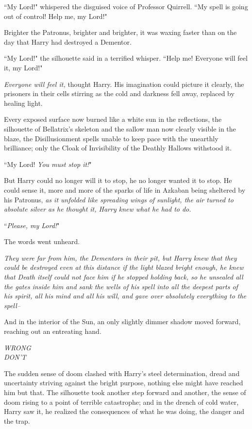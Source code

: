 ``My Lord!" whispered the disguised voice of Professor Quirrell. ``My spell is going out of control! Help me, my Lord!"

Brighter the Patronus, brighter and brighter, it was waxing faster than on the day that Harry had destroyed a Dementor.

``My Lord!" the silhouette said in a terrified whisper. ``Help me! Everyone will feel it, my Lord!"

\emph{Everyone will feel it,} thought Harry. His imagination could picture it clearly, the prisoners in their cells stirring as the cold and darkness fell away, replaced by healing light.

Every exposed surface now burned like a white sun in the reflections, the silhouette of Bellatrix's skeleton and the sallow man now clearly visible in the blaze, the Disillusionment spells unable to keep pace with the unearthly brilliance; only the Cloak of Invisibility of the Deathly Hallows withstood it.

``My Lord! \emph{You must stop it!}"

But Harry could no longer will it to stop, he no longer wanted it to stop. He could sense it, more and more of the sparks of life in Azkaban being sheltered by his Patronus, \emph{as it unfolded like spreading wings of sunlight, the air turned to absolute silver as he thought it, Harry knew what he had to do.}

``\emph{Please, my Lord!}"

The words went unheard.

\emph{They were far from him, the Dementors in their pit, but Harry knew that they could be destroyed even at this distance if the light blazed bright enough, he knew that Death itself could not face him if he stopped holding back, so he unsealed all the gates inside him and sank the wells of his spell into all the deepest parts of his spirit, all his mind and all his will, and gave over absolutely everything to the spell\---}

And in the interior of the Sun, an only slightly dimmer shadow moved forward, reaching out an entreating hand.

\emph{WRONG\\
DON'T}

The sudden sense of doom clashed with Harry's steel determination, dread and uncertainty striving against the bright purpose, nothing else might have reached him but that. The silhouette took another step forward and another, the sense of doom rising to a point of terrible catastrophe; and in the drench of cold water, Harry saw it, he realized the consequences of what he was doing, the danger and the trap.

